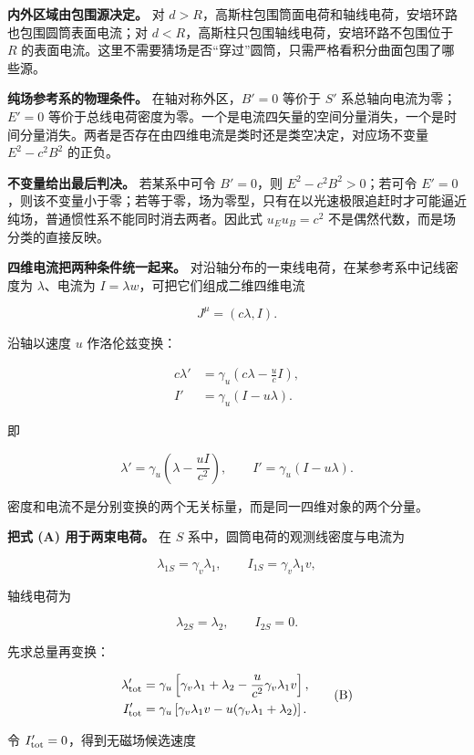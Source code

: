 \documentclass[12pt,a4paper,UTF8]{ctexart}
\begin{document}
\textbf{内外区域由包围源决定。} 对
\(d>R\)，高斯柱包围筒面电荷和轴线电荷，安培环路也包围圆筒表面电流；对
\(d<R\)，高斯柱只包围轴线电荷，安培环路不包围位于 \(R\)
的表面电流。这里不需要猜场是否``穿过''圆筒，只需严格看积分曲面包围了哪些源。

\textbf{纯场参考系的物理条件。} 在轴对称外区，\(B'=0\) 等价于 \(S'\)
系总轴向电流为零；\(E'=0\)
等价于总线电荷密度为零。一个是电流四矢量的空间分量消失，一个是时间分量消失。两者是否存在由四维电流是类时还是类空决定，对应场不变量
\(E^2-c^2B^2\) 的正负。

\textbf{不变量给出最后判决。} 若某系中可令 \(B'=0\)，则
\(E^2-c^2B^2>0\)；若可令
\(E'=0\)，则该不变量小于零；若等于零，场为零型，只有在以光速极限追赶时才可能逼近纯场，普通惯性系不能同时消去两者。因此式
\(u_Eu_B=c^2\) 不是偶然代数，而是场分类的直接反映。

\textbf{四维电流把两种条件统一起来。}
对沿轴分布的一束线电荷，在某参考系中记线密度为 \(\lambda\)、电流为
\(I=\lambda w\)，可把它们组成二维四维电流

\[
J^\mu=(c\lambda,I).
\]

沿轴以速度 \(u\) 作洛伦兹变换：

\[
\begin{aligned}
c\lambda'&=\gamma_u
\left(c\lambda-\frac{u}{c}I\right),\\
I'&=\gamma_u(I-u\lambda).
\end{aligned}
\]

即

\[
\lambda'=\gamma_u\left(\lambda-\frac{uI}{c^2}\right),
\qquad
I'=\gamma_u(I-u\lambda). \tag{A}
\]

密度和电流不是分别变换的两个无关标量，而是同一四维对象的两个分量。

\textbf{把式 (A) 用于两束电荷。} 在 \(S\)
系中，圆筒电荷的观测线密度与电流为

\[
\lambda_{1S}=\gamma_v\lambda_1,
\qquad
I_{1S}=\gamma_v\lambda_1v,
\]

轴线电荷为

\[
\lambda_{2S}=\lambda_2,
\qquad I_{2S}=0.
\]

先求总量再变换：

\[
\begin{aligned}
\lambda'_{\rm tot}
&=\gamma_u\left[\gamma_v\lambda_1+\lambda_2
-\frac{u}{c^2}\gamma_v\lambda_1v\right],\\
I'_{\rm tot}
&=\gamma_u\left[\gamma_v\lambda_1v
-u(\gamma_v\lambda_1+\lambda_2)\right].
\end{aligned} \tag{B}
\]

令 \(I'_{\rm tot}=0\)，得到无磁场候选速度
\end{document}
